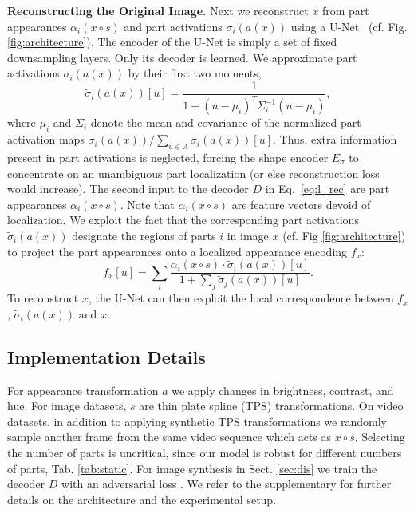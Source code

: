     \textbf{Reconstructing the Original Image.}
    Next we reconstruct $x$ from part appearances %
    $\alpha_i(x {\circ} s)$ and %
    part activations $\sigma_i(a(x))$ using a U-Net~\cite{Ronneberger:2015gk} (cf. Fig. \ref{fig:architecture}). The encoder of the U-Net is simply a set of fixed downsampling layers. Only its decoder is learned.
    We approximate part activations %
    $\sigma_i(a(x))$ by their
    first two moments,
    \begin{equation}
    \tilde{\sigma}_i(a(x))[u] = \frac{1}{1 + (u -\mu_i)^T \Sigma_i^{-1} (u - \mu_i)},
    \end{equation}
    where $\mu_i$ and  $\Sigma_i$ denote the mean and covariance of the normalized part activation maps $\sigma_i(a(x))/\sum_{u \in \Lambda} \sigma_i(a(x))[u]$. Thus, extra information present in part activations %
    is neglected, forcing the shape encoder $E_\sigma$ to concentrate on an unambiguous part localization (or else reconstruction loss would increase).
    The second input to the decoder $D$ in Eq.~\ref{eq:l_rec} are part appearances $\alpha_i(x{\circ} s)$.
    Note that $\alpha_i(x{\circ} s)$ are feature vectors devoid of localization.
    We exploit the fact that the corresponding part activations %
     $\tilde{\sigma}_i(a(x))$ designate the regions of parts $i$ in image $x$ (cf. Fig \ref{fig:architecture}) to project the part appearances onto a localized appearance encoding $f_x$:
    \begin{equation}
        f_x[u]=  \sum_i
        \frac{ \alpha_i(x{\circ} s) \cdot \tilde{\sigma}_i(a(x))[u]}
        {1+ \sum_j \tilde{\sigma}_j(a(x))[u]}
        .
    \end{equation}
    To reconstruct $x$, the U-Net can then exploit the local correspondence between $f_x$,  $\tilde{\sigma}_i(a(x))$ and $x$.

\subsection{Implementation Details}
For appearance transformation $a$ we apply changes in brightness, contrast, and hue.
For image datasets, $s$ are thin plate spline (TPS) transformations.
On video datasets, in addition to applying synthetic TPS transformations we randomly sample another frame from the same video sequence which acts as $x {\circ} s$.
%
Selecting the number of parts is uncritical, since our model is robust for different numbers of parts, Tab. \ref{tab:static}.
%
For image synthesis in Sect. \ref{sec:dis} we train the decoder $D$ with an adversarial loss \cite{Isola2017image}.
We refer to the supplementary for further details on the architecture and the experimental setup.
